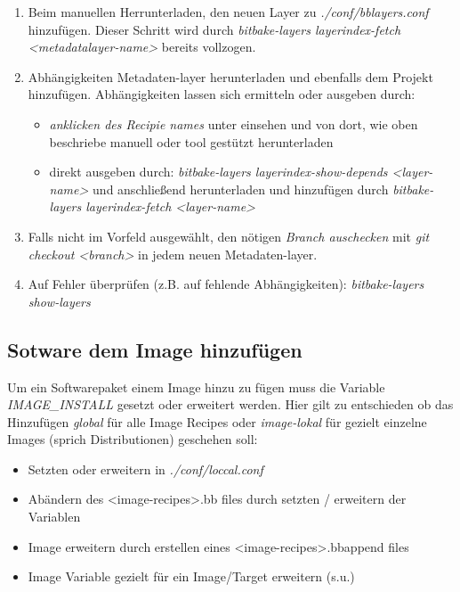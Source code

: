 \begin{enumerate}
    \item Beim manuellen Herrunterladen, den neuen Layer zu
        \textit{./conf/bblayers.conf} hinzufügen. Dieser
        Schritt wird durch \textit{bitbake-layers layerindex-fetch
            <metadatalayer-name>} bereits vollzogen.
    \item Abhängigkeiten Metadaten-layer herunterladen und ebenfalls dem Projekt
        hinzufügen. Abhängigkeiten lassen sich ermitteln oder ausgeben durch:
        \begin{itemize}
            \item \textit{anklicken des Recipie
                    names} unter \cite{OpenEmbedded:Indexer_Recipes} einsehen
                    und von dort, wie oben beschriebe manuell oder tool gestützt
                    herunterladen
            \item direkt ausgeben durch:
                \textit{bitbake-layers layerindex-show-depends <layer-name>}
                und anschließend herunterladen und hinzufügen durch
                \textit{bitbake-layers layerindex-fetch <layer-name>}
        \end{itemize}
    \item Falls nicht im Vorfeld ausgewählt, den nötigen
        \textit{Branch auschecken} mit \textit{git checkout <branch>} in jedem
        neuen Metadaten-layer.
    \item Auf Fehler überprüfen (z.B. auf fehlende Abhängigkeiten):
        \textit{bitbake-layers show-layers}
\end{enumerate}

\subsection{Sotware dem Image hinzufügen}%
\label{sub:sotware_dem_image_hinzufugen_}
Um ein Softwarepaket einem Image hinzu zu fügen muss die Variable
\textit{IMAGE\_INSTALL} gesetzt oder erweitert werden. Hier gilt zu entschieden
ob das Hinzufügen \textit{global} für alle Image Recipes oder \textit{image-lokal}
für gezielt einzelne Images (sprich Distributionen) geschehen soll:
\begin{itemize}
    \item Setzten oder erweitern in \textit{./conf/loccal.conf}
    \item Abändern des <image-recipes>.bb files durch setzten / erweitern der
        Variablen
    \item Image erweitern durch erstellen eines <image-recipes>.bbappend files
    \item Image Variable gezielt für ein Image/Target erweitern (s.u.)
\end{itemize}

